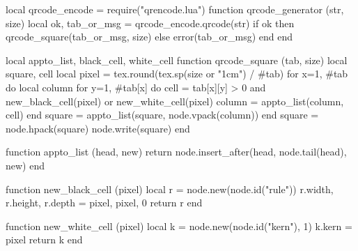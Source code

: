 \RequirePackage{luacode}

\begin{luacode*}
local qrcode_encode = require("qrencode.lua")
function qrcode_generator (str, size)
  local ok, tab_or_msg = qrcode_encode.qrcode(str)
  if ok then
    qrcode_square(tab_or_msg, size)
  else
    error(tab_or_msg)
  end
end

local appto_list, black_cell, white_cell
function qrcode_square (tab, size)
  local square, cell
  local pixel = tex.round(tex.sp(size or "1cm") / #tab)
  for x=1, #tab do
    local column
    for y=1, #tab[x] do
      cell = tab[x][y] > 0 and new_black_cell(pixel)
                            or new_white_cell(pixel)
      column = appto_list(column, cell)
    end
    square = appto_list(square, node.vpack(column))
  end
  square = node.hpack(square)
  node.write(square)
end

function appto_list (head, new)
  return node.insert_after(head, node.tail(head), new)
end

function new_black_cell (pixel)
  local r = node.new(node.id("rule"))
  r.width, r.height, r.depth = pixel, pixel, 0
  return r
end

function new_white_cell (pixel)
  local k = node.new(node.id("kern"), 1)
  k.kern = pixel
  return k
end
\end{luacode*}

\newcommand*\qrcode[2][1cm]{%
  \quitvmode
  \directlua{qrcode_generator("\luatexluaescapestring{#2}",
                              "\the\dimexpr#1\relax")}}